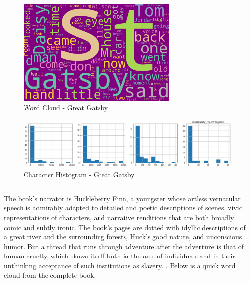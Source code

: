 \begin{figure}[H]
	\begin{center}
		\includegraphics[width = 0.7\textwidth]{Images/GreatGatsby_FScottFitzgerald.jpeg} %
		\caption{Word Cloud - Great Gatsby}
		\label{fig:great-gatsby}
	\end{center}
\end{figure}

\begin{figure}[H]
	\begin{center}
		\includegraphics[width = 1.0\textwidth]{Images/char_hist_GreatGatsby_FScottFitzgerald.jpeg} %
		\caption{Character Histogram - Great Gatsby}
		\label{fig:histogram-greatgatsby}
	\end{center}
\end{figure}


\subsection{\textcite{huckleberry-finn}} %
\label{sec:huckleberry-finn} %

The book’s narrator is Huckleberry Finn, a youngster whose artless vernacular speech is admirably adapted to detailed and poetic descriptions of scenes, vivid representations of characters, and narrative renditions that are both broadly comic and subtly ironic. The book’s pages are dotted with idyllic descriptions of a great river and the surrounding forests, Huck’s good nature, and unconscious humor. But a thread that runs through adventure after the adventure is that of human cruelty, which shows itself both in the acts of individuals and in their unthinking acceptance of such institutions as slavery. \textcite{huckleberry-finn-summary}. Below is a quick word cloud from the complete book. 

